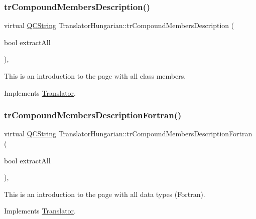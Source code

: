 \subsubsection{\texorpdfstring{trCompoundMembersDescription()}{trCompoundMembersDescription()}}
{\footnotesize\ttfamily virtual \mbox{\hyperlink{class_q_c_string}{Q\+C\+String}} Translator\+Hungarian\+::tr\+Compound\+Members\+Description (\begin{DoxyParamCaption}\item[{bool}]{extract\+All }\end{DoxyParamCaption})\hspace{0.3cm}{\ttfamily [inline]}, {\ttfamily [virtual]}}

This is an introduction to the page with all class members. 

Implements \mbox{\hyperlink{class_translator}{Translator}}.

\mbox{\label{class_translator_hungarian_ab276aef7d4c5aeccba351fc2827dfa33}} 
\subsubsection{\texorpdfstring{trCompoundMembersDescriptionFortran()}{trCompoundMembersDescriptionFortran()}}
{\footnotesize\ttfamily virtual \mbox{\hyperlink{class_q_c_string}{Q\+C\+String}} Translator\+Hungarian\+::tr\+Compound\+Members\+Description\+Fortran (\begin{DoxyParamCaption}\item[{bool}]{extract\+All }\end{DoxyParamCaption})\hspace{0.3cm}{\ttfamily [inline]}, {\ttfamily [virtual]}}

This is an introduction to the page with all data types (Fortran). 

Implements \mbox{\hyperlink{class_translator}{Translator}}.

\mbox{\label{class_translator_hungarian_aa69547adf47e7e69af508f803fd2c75c}} 
